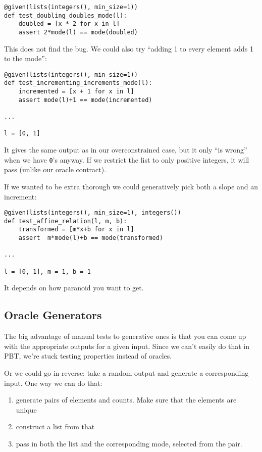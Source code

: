 \begin{verbatim}
@given(lists(integers(), min_size=1))
def test_doubling_doubles_mode(l):
    doubled = [x * 2 for x in l]
    assert 2*mode(l) == mode(doubled)
\end{verbatim}
This does not find the bug. We could also try ``adding 1 to every
element adds 1 to the mode'':

\begin{verbatim}
@given(lists(integers(), min_size=1))
def test_incrementing_increments_mode(l):
    incremented = [x + 1 for x in l]
    assert mode(l)+1 == mode(incremented)

...

l = [0, 1]
\end{verbatim}

It gives the same output as in our overconstrained case, but it only
``is wrong'' when we have \texttt{0}'s anyway. If we restrict the list to only
positive integers, it will pass (unlike our oracle contract).

If we wanted to be extra thorough we could generatively pick both a
slope and an increment:

\begin{verbatim}
@given(lists(integers(), min_size=1), integers())
def test_affine_relation(l, m, b):
    transformed = [m*x+b for x in l]
    assert  m*mode(l)+b == mode(transformed)

...

l = [0, 1], m = 1, b = 1
\end{verbatim}
It depends on how paranoid you want to get.

\subsection{Oracle Generators}\label{oracle-generators}

The big advantage of manual tests to generative ones is that you can
come up with the appropriate outputs for a given input. Since we can't
easily do that in PBT, we're stuck testing properties instead of
oracles.

Or we could go in reverse: take a random output and generate a
corresponding input. One way we can do that:

\begin{enumerate}

\item
  generate pairs of elements and counts. Make sure that the elements are
  unique
\item
  construct a list from that
\item
  pass in both the list and the corresponding mode, selected from the
  pair.
\end{enumerate}

